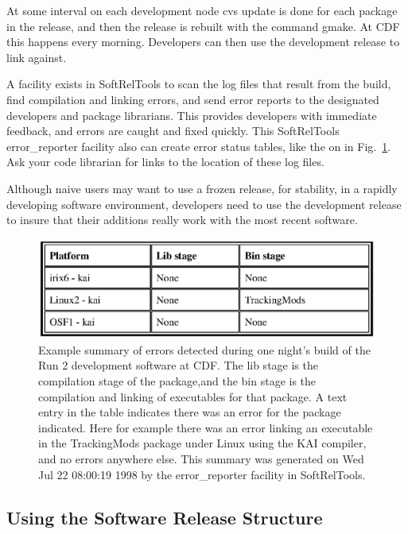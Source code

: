 \documentclass[12pt]{article}
\begin{document}
At some interval on each development node 
{\ttfamily cvs update} is done for each package in the release, and 
then the release is rebuilt with the command {\ttfamily gmake}. At
CDF this happens every morning. Developers
can then use the development release to link against.  

A facility exists in 
SoftRelTools to scan the log files that result from the build,
find compilation and linking errors, and send error reports to the designated
developers and package librarians.  
This provides developers with immediate
feedback, and errors are caught and fixed quickly.  
This SoftRelTools error\_reporter facility
also can create error status tables, like the on in Fig.~\ref{fig_status_table}.
Ask your code librarian for links to the location of these log files. 

Although naive users may want to use a frozen release, for stability, 
in a rapidly developing software environment, developers need to use 
the development release to insure that their additions really work with
the most recent software.  

\begin{figure}[tbh]
\centerline{\includegraphics[width=4.5in]{status_table.eps}}
\vspace*{-4.7in}
\caption[Status Table for Development Release]{ 
Example summary of errors detected during one night's build of the 
Run 2 development 
software at CDF. The lib stage is the compilation stage of the package,and 
the bin stage is the compilation and linking of executables for that package.
A text entry in the table indicates there was an error for the package 
indicated. Here for example there was an error linking an executable in the
TrackingMods package under Linux using the KAI compiler, and no errors 
anywhere else. This summary was generated on Wed Jul 22 08:00:19 1998 by the
error\_reporter facility in SoftRelTools.}
\label{fig_status_table}
\end{figure}

\subsection{Using the Software Release Structure}
\label{sec_examples}
\end{document}
